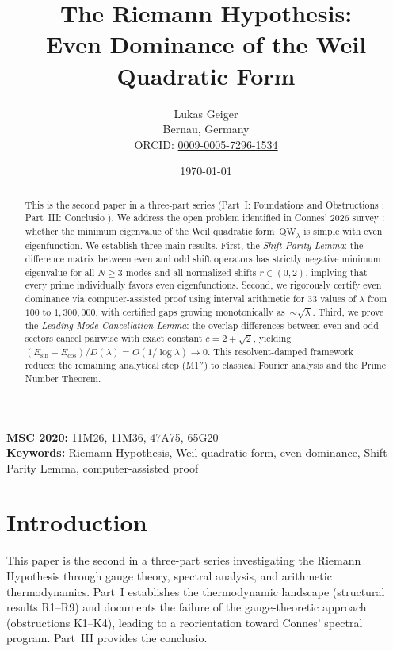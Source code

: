 \documentclass[12pt,a4paper]{article}
\title{The Riemann Hypothesis:\\ Even Dominance of the Weil Quadratic Form}
\author{Lukas Geiger\\
\small Bernau, Germany\\
\small ORCID: \href{https://orcid.org/0009-0005-7296-1534}{0009-0005-7296-1534}}
\date{\today}
\theoremstyle{definition}
\theoremstyle{remark}
\begin{document}
\overfullrule=0pt
\maketitle

\begin{abstract}
This is the second paper in a three-part series (Part~I: Foundations and Obstructions \cite{Geiger2026partI}; Part~III: Conclusio \cite{Geiger2026partIII}). We address the open problem identified in Connes' 2026 survey \cite{Connes2025}: whether the minimum eigenvalue of the Weil quadratic form~$\mathrm{QW}_\lambda$ is simple with even eigenfunction. We establish three main results. First, the \emph{Shift Parity Lemma}: the difference matrix between even and odd shift operators has strictly negative minimum eigenvalue for all $N \geq 3$ modes and all normalized shifts $r \in (0,2)$, implying that every prime individually favors even eigenfunctions. Second, we rigorously certify even dominance via computer-assisted proof using interval arithmetic for $33$ values of $\lambda$ from $100$ to $1{,}300{,}000$, with certified gaps growing monotonically as~$\sim\!\sqrt{\lambda}$. Third, we prove the \emph{Leading-Mode Cancellation Lemma}: the overlap differences between even and odd sectors cancel pairwise with exact constant $c = 2 + \sqrt{2}$, yielding $(E_{\sin} - E_{\cos})/D(\lambda) = O(1/\log\lambda) \to 0$. This resolvent-damped framework reduces the remaining analytical step (M1$''$) to classical Fourier analysis and the Prime Number Theorem.
\end{abstract}

\noindent\textbf{MSC 2020:} 11M26, 11M36, 47A75, 65G20\\
\textbf{Keywords:} Riemann Hypothesis, Weil quadratic form, even dominance, Shift Parity Lemma, computer-assisted proof

\newpage
\tableofcontents
\newpage

\section{Introduction}
\label{sec:intro}

This paper is the second in a three-part series investigating the Riemann Hypothesis through gauge theory, spectral analysis, and arithmetic thermodynamics. Part~I \cite{Geiger2026partI} establishes the thermodynamic landscape (structural results R1--R9) and documents the failure of the gauge-theoretic approach (obstructions K1--K4), leading to a reorientation toward Connes' spectral program. Part~III \cite{Geiger2026partIII} provides the conclusio.
\end{document}

